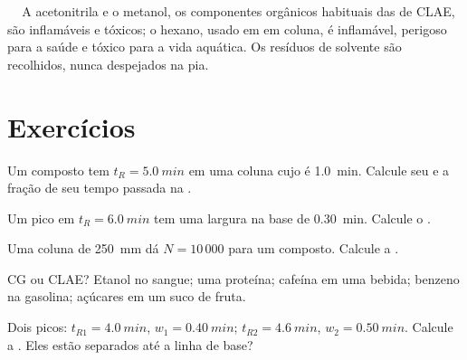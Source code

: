 \begin{safety}{\,\,\,\,\,}
A acetonitrila e o metanol, os componentes orgânicos habituais das  de CLAE, são inflamáveis
e tóxicos; o hexano, usado em  em coluna, é inflamável, perigoso para a saúde e tóxico para
a vida aquática. Os resíduos de solvente são recolhidos, nunca despejados na pia.
\end{safety}

\section{Exercícios}

\begin{exercise}[$\star$]\label{exo:b2:chromatography:1}
Um composto tem $t_R = \qty{5.0}{min}$ em uma coluna cujo  é \qty{1.0}{min}. Calcule seu
 e a fração de seu tempo passada na .
\end{exercise}

\begin{exercise}[$\star$]\label{exo:b2:chromatography:2}
Um pico em $t_R = \qty{6.0}{min}$ tem uma largura na base de \qty{0.30}{min}. Calcule o .
\end{exercise}

\begin{exercise}[$\star$]\label{exo:b2:chromatography:3}
Uma coluna de \qty{250}{mm} dá $N = 10\,000$ para um composto. Calcule a .
\end{exercise}

\begin{exercise}[$\star$]\label{exo:b2:chromatography:4}
CG ou CLAE? Etanol no sangue; uma proteína; cafeína em uma bebida; benzeno na gasolina; açúcares em um suco de fruta.
\end{exercise}

\begin{exercise}[$\star\star$]\label{exo:b2:chromatography:5}
Dois picos: $t_{R1} = \qty{4.0}{min}$, $w_1 = \qty{0.40}{min}$; $t_{R2} = \qty{4.6}{min}$, $w_2 =
\qty{0.50}{min}$. Calcule a . Eles estão separados até a linha de base?
\end{exercise}

